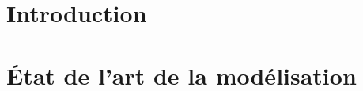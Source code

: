\documentclass[fleqn,8pt,t]{beamer}
\newcommand{\ex}[1]{\textcolor{couleurex}{#1}}
\newcommand{\tcite}[1]{\textcolor{couleurcit}{[#1]}}
\newcommand{\tval}[1]{\textbf{#1}}
\begin{document}


\newcommand{\cmodels}{\bigskip
\quad\tval{\ex{egfr20}}: \tcite{Epidermal Growth Factor Receptor, by Özgür Sahin \textit{et al.}}\\
\quad\tval{\ex{egfr104}}: \tcite{Epidermal Growth Factor Receptor, by Regina Samaga \textit{et al.}}\\
\quad\tval{\ex{tcrsig40}}: \tcite{T-Cell Receptor Signaling, by Steffen Klamt \textit{et al.}}\\
\quad\tval{\ex{tcrsig94}}: \tcite{T-Cell Receptor Signaling, by Julio Saez-Rodriguez \textit{et al.}}\\}

\newcommand{\cfpmrcsbio}{Folschette \textit{et al.} in Workshop on Interactions between Computer Science and Biology, 2013}
\newcommand{\cpmrtcsb}{Paulevé \textit{et al.} in Transactions on Computational Systems Biology, 2011}
\newcommand{\cpmrmscs}{Paulevé \textit{et al.} in Mathematical Structures in Computer Science, 2012}
\newcommand{\paulevephd}{Paulevé (PhD thesis), 2011}



\section{Introduction}


\section{État de l'art de la modélisation}


\end{document}

